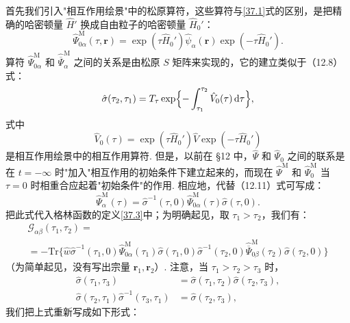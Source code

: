 首先我们引入"相互作用绘景"中的松原算符，这些算符与\eqref{37.1}式的区别，是把精确的哈密顿量 $\hat H'$ 换成自由粒子的哈密顿量 $\hat H_0'$：
\begin{equation}
\hat\Psi^{\mathrm M}_{0\alpha}(\tau,\bm r)=\exp(\tau\hat H_0')\hat\psi_{\alpha}(\bm r)\exp(-\tau\hat H_0').
\label{38.1}
\end{equation}
算符 $\hat\Psi^{\mathrm M}_{0\alpha}$ 和 $\hat{\overline\Psi}^{\mathrm M}_{\alpha}$ 之间的关系是由松原 $S$ 矩阵来实现的，它的建立类似于（12.8）式：
\begin{equation}
\hat\sigma(\tau_2,\tau_1)=T_\tau\exp\Bigl\{-\int_{\tau_1}^{\tau_2}\hat V_0(\tau)\,\mathrm{d}\tau\Bigr\},
\label{38.2}
\end{equation}
式中
\begin{equation}
\hat V_0(\tau)=\exp(\tau\hat H_0')\hat V\exp(-\tau\hat H_0')
\label{38.3}
\end{equation}
是相互作用绘景中的相互作用算符. 但是，以前在 §12 中，$\hat\Psi$ 和 $\hat\Psi_0$ 之间的联系是在 $t=-\infty$ 时"加入"相互作用的初始条件下建立起来的，而现在 $\hat\Psi^{\mathrm M}$ 和 $\hat\Psi^{\mathrm M}_0$ 当 $\tau=0$ 时相重合应起着"初始条件"的作用. 相应地，代替（12.11）式可写成：
\begin{equation}
\hat\Psi^{\mathrm M}_{\alpha}(\tau)=\hat\sigma^{-1}(\tau,0)\hat\Psi^{\mathrm M}_{0\alpha}(\tau)\hat\sigma(\tau,0).
\label{38.4}
\end{equation}
把此式代入格林函数的定义\eqref{37.3}中；为明确起见，取 $\tau_1>\tau_2$，我们有：
\begin{equation*}
\begin{aligned}
\mathcal G_{\alpha\beta}(\tau_1,\tau_2)=\\
=-\mathrm{Tr}\bigl\{\hat w\hat\sigma^{-1}(\tau_1,0)\hat\Psi^{\mathrm M}_{0\alpha}(\tau_1)\hat\sigma(\tau_1,0)\hat\sigma^{-1}(\tau_2,0)\hat{\overline\Psi}^{\mathrm M}_{0\beta}(\tau_2)\hat\sigma(\tau_2,0)\bigr\}
\end{aligned}
\end{equation*}
（为简单起见，没有写出宗量 $\bm r_1,\bm r_2$）. 注意，当 $\tau_1>\tau_2>\tau_3$ 时，
\begin{equation*}
\begin{aligned}
\hat\sigma(\tau_1,\tau_3)&=\hat\sigma(\tau_1,\tau_2)\hat\sigma(\tau_2,\tau_3),\\
\hat\sigma(\tau_2,\tau_1)\hat\sigma^{-1}(\tau_3,\tau_1)&=\hat\sigma(\tau_2,\tau_3),
\end{aligned}
\end{equation*}
我们把上式重新写成如下形式：
